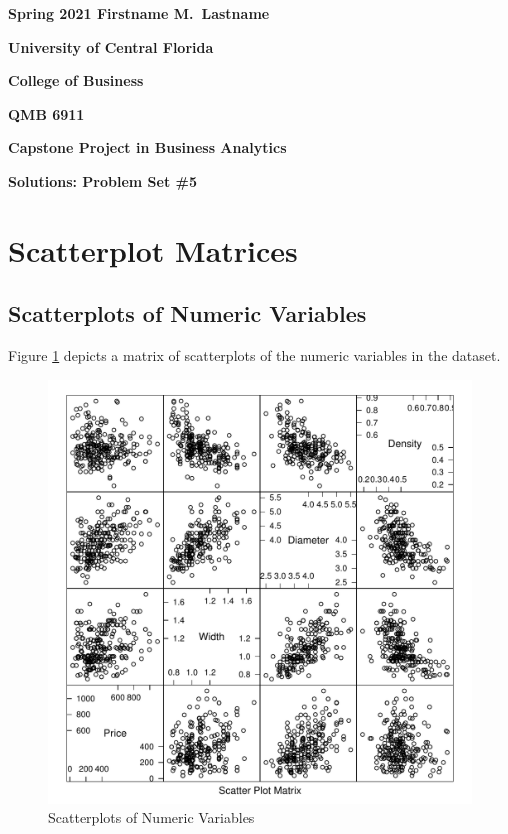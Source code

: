 \documentclass[11pt]{book}
\begin{document}

\pagestyle{empty}
{\noindent\bf Spring 2021 \hfill Firstname M.~Lastname}
\vskip 16pt
\centerline{\bf University of Central Florida}
\centerline{\bf College of Business}
\vskip 16pt
\centerline{\bf QMB 6911}
\centerline{\bf Capstone Project in Business Analytics}
\vskip 10pt
\centerline{\bf Solutions:  Problem Set \#5}
\vskip 32pt
\noindent


\section*{Scatterplot Matrices}


\subsection*{Scatterplots of Numeric Variables}

Figure \ref{fig:slpom_num_only} depicts a matrix of scatterplots
of the numeric variables in the dataset.

\begin{figure}[h!]
  \centering
  \includegraphics[scale = 0.5, keepaspectratio=true]{../Figures/slpom_num_only}
  \caption{Scatterplots of Numeric Variables} \label{fig:slpom_num_only}
\end{figure}
\end{document}
